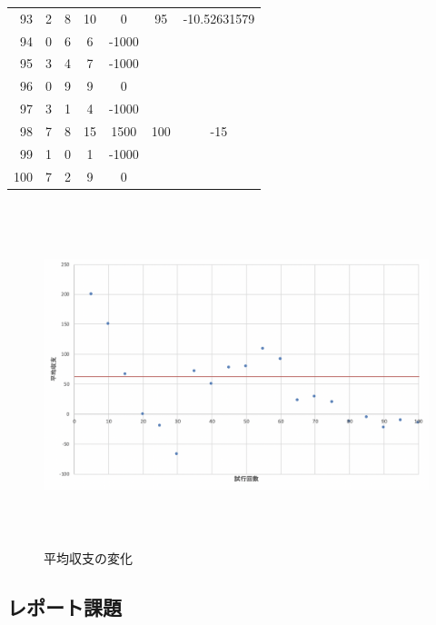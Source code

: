 \documentclass[12pt]{jarticle}
\begin{document}
\begin{table}
\begin{tabular}[h]{|r|c|c|c|c|c|c|}
        93       & 2             & 8             & 10           & 0     & 95       & -10.52631579 \\
        94       & 0             & 6             & 6            & -1000 &          &              \\
        95       & 3             & 4             & 7            & -1000 &          &              \\
        \hline
        96       & 0             & 9             & 9            & 0     &          &              \\
        97       & 3             & 1             & 4            & -1000 &          &              \\
        98       & 7             & 8             & 15           & 1500  & 100      & -15          \\
        99       & 1             & 0             & 1            & -1000 &          &              \\
        100      & 7             & 2             & 9            & 0     &          &              \\
        \hline
    \end{tabular}
\end{table}
\begin{figure}[h]
    \begin{center}
        \includegraphics[bb=0 0 1270 762,height=10cm]{kadai4_graph1.png}
    \end{center}
    \caption{平均収支の変化}
    \label{fig1}
\end{figure}

\clearpage
\subsection{レポート課題}
\end{document}
